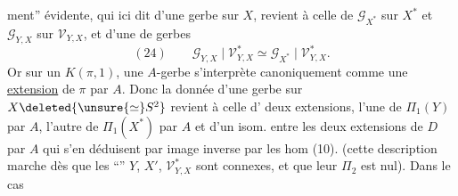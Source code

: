 ment'' évidente, qui ici dit 
d'une gerbe 
sur $X$, revient à celle de  $\mathcal G_{X^*}$ sur
$X^*$ et $\mathcal G_{Y,X}$ sur $\mathcal V_{Y,X}$, et d'une
 de  gerbes
\[
(24)\qquad \mathcal G_{Y,X}\mid\mathcal V^*_{Y,X}\simeq
\mathcal G_{X^*}\mid\mathcal V^*_{Y,X}.
\]
Or sur un $K(\pi,1)$, une $A$-gerbe
s'interprète canoniquement comme une
\uline{extension} de $\pi$ par $A$. Donc la donnée
d'une gerbe sur $X\deleted{{}\unsure{\simeq} S^2}$\unsure{,} revient à celle
d' deux extensions, l'une de
$\Pi_1(Y)$ par $A$, l'autre de $\Pi_1(X^*)$ par $A$
et d'un isom. entre les deux extensions
de $D$ par $A$ qui s'en déduisent\unsure{,}
par image inverse par les hom (10).
(cette description marche dès que les
``'' $Y$, $X'$, $\mathcal V^*_{Y,X}$ sont connexes, et
que leur $\Pi_2$ est nul). Dans le cas
